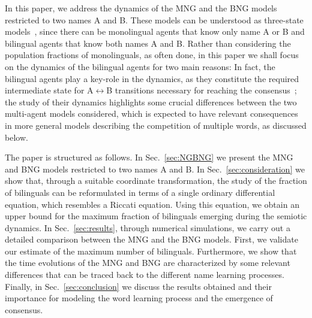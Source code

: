 \documentclass[review]{elsarticle}
\newcommand{\+}{\! + \!}
\begin{document}

In this paper, we address the dynamics of the MNG and the BNG models restricted to two names A and B.
These models can be understood as  three-state models~\cite{Patriarca-2012a,Patriarca-2020a}, since there can be monolingual agents that know only name  A or B and bilingual agents that know both names A and B.
Rather than considering the population fractions of monolinguals, as often done, in this paper we shall focus on the dynamics of the bilingual agents for two main reasons:
In fact,  the bilingual agents play a key-role in the dynamics, as they constitute the required intermediate state for A$\leftrightarrow$B transitions necessary for reaching the consensus~\cite{Castello2006a, Marchetti-2020a};
the study of their dynamics highlights some crucial differences between the two multi-agent models considered, which is expected to have relevant consequences in more general models describing the competition of multiple words, as discussed below.


The paper is structured as follows.
In Sec.~\ref{sec:NGBNG} we present the MNG and BNG models restricted to two names A and B.
In Sec.~\ref{sec:consideration} we show that, through a suitable coordinate transformation, the study of the fraction of bilinguals can be reformulated in terms of a single ordinary differential equation, which resembles a Riccati equation.
Using this equation, we obtain an upper bound for the maximum fraction of bilinguals emerging during the semiotic dynamics.
In Sec.~\ref{sec:results}, through numerical simulations, we carry out a detailed comparison between the MNG and the BNG models.
First, we validate our estimate of the maximum number of bilinguals.
Furthermore, we show that the time evolutions of the MNG and BNG are characterized by some relevant differences that can be traced back to the different name learning processes.
Finally, in Sec.~\ref{sec:conclusion} we discuss the results obtained and their importance for modeling the word learning process and the emergence of consensus.
 
\end{document}
